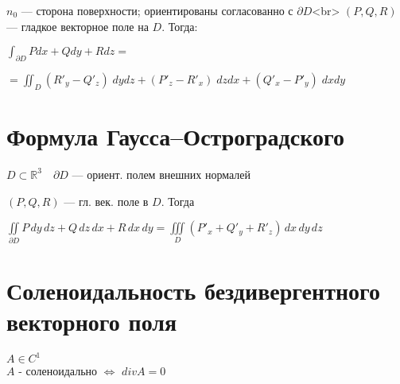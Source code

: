 \documentclass[paper=a4, fontsize=17pt]{article}
\begin{document}
$n_0$ — сторона поверхности; ориентированы согласованно с $\partial D$<br>
$(P,Q,R)$ — гладкое векторное поле на $D$. Тогда:

$\displaystyle\int_{\partial D} P dx + Q dy + R dz =$

$= \displaystyle\iint_D (R'_y - Q'_z) \;dy dz + (P'_z - R'_x) \;dz dx + (Q'_x - P'_y) \;dx dy$

\section{Формула Гаусса--Остроградского}

$D \subset \mathbb R^3 \quad \partial D$ — ориент. полем внешних нормалей

$(P, Q, R)$ — гл. век. поле в $D$. Тогда


 $\displaystyle\iint\limits_{\partial D} P \,dy\,dz + Q \,dz\,dx + R \,dx\,dy = \iiint\limits_D (P'_x + Q'_y + R'_z)\,dx\,dy\,dz$

\section{Соленоидальность бездивергентного векторного поля}
$A \in C^1$ \\
$A$ - соленоидально $\Leftrightarrow$ $div A = 0$
\end{document}
